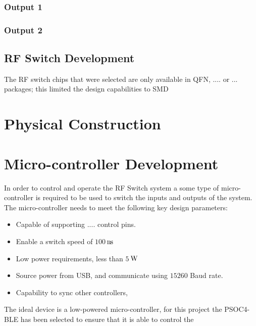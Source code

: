 \documentclass[12pt,openany,a4paper]{book}
\newcommand{\pack}	{\hspace{-0.08em}}
\newcommand{\ns}	{\ensuremath{\rm\,n\pack s}}
\newcommand{\W}		{\ensuremath{\rm\,W}}
\begin{document}
\subsubsection{Output 1}

\subsubsection{Output 2}




\subsection{RF Switch Development}


The RF switch chips that were selected are only available in QFN, .... or ... packages; this limited the design capabilities to SMD




\section{Physical Construction}








\section{Micro-controller Development}		\label{sec:micro_dev}
In order to control and operate the RF Switch system a some type of micro-controller is required to be used to switch the inputs and outputs of the system. The micro-controller needs to meet the following key design parameters:
\begin{itemize}
	\setlength\itemsep{-0.5em}
	\item Capable of supporting .... control pins.
	\item Enable a switch speed of $100$\ns
	\item Low power requirements, less than $5$\W
	\item Source power from USB, and communicate using $15260$ Baud rate.
	\item Capability to sync other controllers, 
\end{itemize}
The ideal device is a low-powered micro-controller, for this project the PSOC4-BLE has been selected to ensure that it is able to control the 
\end{document}
